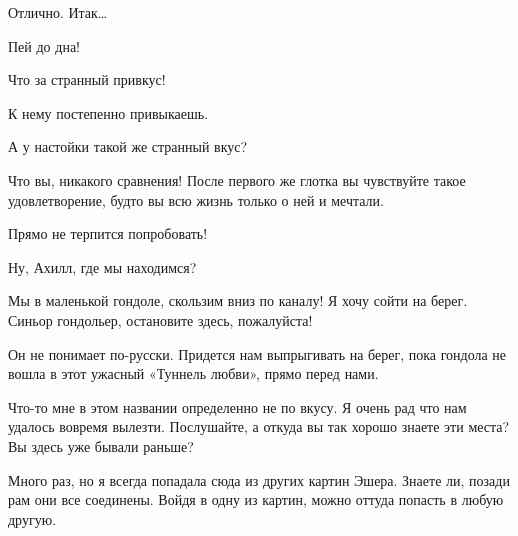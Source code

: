 \documentclass[../main.tex]{subfiles}
\begin{document}
\begin{Dialogue}
\begin{sublevel}
 Отлично. Итак\ldots{}


 Пей до дна!



\begin{sublevel}


 Что за странный привкус!

 К нему постепенно привыкаешь.

 А у настойки такой же странный вкус?

 Что вы, никакого сравнения! После первого же глотка вы чувствуйте такое удовлетворение, будто вы всю жизнь только о ней и мечтали.

 Прямо не терпится попробовать!

 Ну, Ахилл, где мы находимся?

 Мы в маленькой гондоле, скользим вниз по каналу! Я хочу сойти на берег. Синьор гондольер, остановите здесь, пожалуйста!



 Он не понимает по-русски. Придется нам выпрыгивать на берег, пока гондола не вошла в этот ужасный «Туннель любви», прямо перед нами.


 Что-то мне в этом названии определенно не по вкусу. Я очень рад что нам удалось вовремя вылезти. Послушайте, а откуда вы так хорошо знаете эти места? Вы здесь уже бывали раньше?

 Много раз, но я всегда попадала сюда из других картин Эшера. Знаете ли, позади рам они все соединены. Войдя в одну из картин, можно оттуда попасть в любую другую.


\end{sublevel}
\end{sublevel}
\end{Dialogue}
\end{document}
